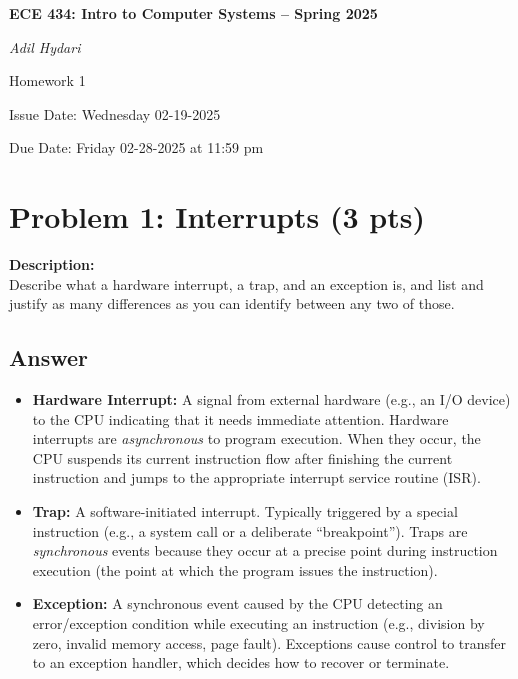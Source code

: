 \documentclass[12pt]{article}
\begin{document}
	
	\begin{titlepage}
		\centering
		{\Large\bfseries ECE 434: Intro to Computer Systems -- Spring 2025 \par}
		{\large\textit{Adil Hydari} \par}
		\vspace{0.5cm}
		{\Large Homework 1 \par}
		\vspace{0.25cm}
		{\large Issue Date: Wednesday 02-19-2025 \par}
		{\large Due Date: Friday 02-28-2025 at 11:59 pm \par}
	\end{titlepage}
	
	\tableofcontents
	\newpage
	
	\section{Problem 1: Interrupts (3 pts)}
	\textbf{Description:} \\
	Describe what a hardware interrupt, a trap, and an exception is, and list and justify as many differences as you can identify between any two of those.
	
	\subsection*{Answer}
	\begin{itemize}
		\item \textbf{Hardware Interrupt:} A signal from external hardware (e.g., an I/O device) to the CPU indicating that it needs immediate attention. Hardware interrupts are \emph{asynchronous} to program execution. When they occur, the CPU suspends its current instruction flow after finishing the current instruction and jumps to the appropriate interrupt service routine (ISR).
		\item \textbf{Trap:} A software-initiated interrupt. Typically triggered by a special instruction (e.g., a system call or a deliberate “breakpoint”). Traps are \emph{synchronous} events because they occur at a precise point during instruction execution (the point at which the program issues the instruction).
		\item \textbf{Exception:} A synchronous event caused by the CPU detecting an error/exception condition while executing an instruction (e.g., division by zero, invalid memory access, page fault). Exceptions cause control to transfer to an exception handler, which decides how to recover or terminate.
	\end{itemize}
	
\end{document}
